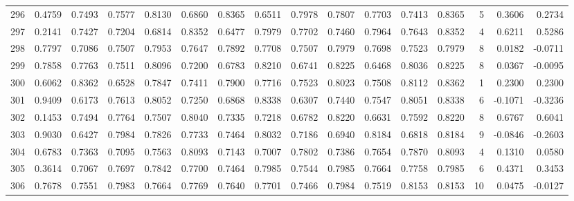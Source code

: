 \begin{tabular}{lrrrrrrrrrrrrrrr}
296 &      0.4759 &  0.7493 &  0.7577 &  0.8130 &  0.6860 &  0.8365 &  0.6511 &  0.7978 &  0.7807 &  0.7703 &   0.7413 &     0.8365 &      5 &                    0.3606 &                     0.2734 \\
297 &      0.2141 &  0.7427 &  0.7204 &  0.6814 &  0.8352 &  0.6477 &  0.7979 &  0.7702 &  0.7460 &  0.7964 &   0.7643 &     0.8352 &      4 &                    0.6211 &                     0.5286 \\
298 &      0.7797 &  0.7086 &  0.7507 &  0.7953 &  0.7647 &  0.7892 &  0.7708 &  0.7507 &  0.7979 &  0.7698 &   0.7523 &     0.7979 &      8 &                    0.0182 &                    -0.0711 \\
299 &      0.7858 &  0.7763 &  0.7511 &  0.8096 &  0.7200 &  0.6783 &  0.8210 &  0.6741 &  0.8225 &  0.6468 &   0.8036 &     0.8225 &      8 &                    0.0367 &                    -0.0095 \\
300 &      0.6062 &  0.8362 &  0.6528 &  0.7847 &  0.7411 &  0.7900 &  0.7716 &  0.7523 &  0.8023 &  0.7508 &   0.8112 &     0.8362 &      1 &                    0.2300 &                     0.2300 \\
301 &      0.9409 &  0.6173 &  0.7613 &  0.8052 &  0.7250 &  0.6868 &  0.8338 &  0.6307 &  0.7440 &  0.7547 &   0.8051 &     0.8338 &      6 &                   -0.1071 &                    -0.3236 \\
302 &      0.1453 &  0.7494 &  0.7764 &  0.7507 &  0.8040 &  0.7335 &  0.7218 &  0.6782 &  0.8220 &  0.6631 &   0.7592 &     0.8220 &      8 &                    0.6767 &                     0.6041 \\
303 &      0.9030 &  0.6427 &  0.7984 &  0.7826 &  0.7733 &  0.7464 &  0.8032 &  0.7186 &  0.6940 &  0.8184 &   0.6818 &     0.8184 &      9 &                   -0.0846 &                    -0.2603 \\
304 &      0.6783 &  0.7363 &  0.7095 &  0.7563 &  0.8093 &  0.7143 &  0.7007 &  0.7802 &  0.7386 &  0.7654 &   0.7870 &     0.8093 &      4 &                    0.1310 &                     0.0580 \\
305 &      0.3614 &  0.7067 &  0.7697 &  0.7842 &  0.7700 &  0.7464 &  0.7985 &  0.7544 &  0.7985 &  0.7664 &   0.7758 &     0.7985 &      6 &                    0.4371 &                     0.3453 \\
306 &      0.7678 &  0.7551 &  0.7983 &  0.7664 &  0.7769 &  0.7640 &  0.7701 &  0.7466 &  0.7984 &  0.7519 &   0.8153 &     0.8153 &     10 &                    0.0475 &                    -0.0127 \\

\end{tabular}
